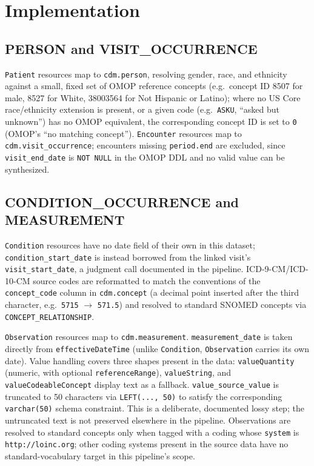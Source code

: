 \documentclass[11pt]{article}
\begin{document}
\section{Implementation}

\subsection{PERSON and VISIT\_OCCURRENCE}

\texttt{Patient} resources map to \texttt{cdm.person}, resolving gender,
race, and ethnicity against a small, fixed set of OMOP reference concepts
(e.g.\ concept ID 8507 for male, 8527 for White, 38003564 for Not Hispanic
or Latino); where no US Core race/ethnicity extension is present, or a
given code (e.g.\ \texttt{ASKU}, ``asked but unknown'') has no OMOP
equivalent, the corresponding concept ID is set to \texttt{0} (OMOP's ``no matching
concept''). \texttt{Encounter} resources map to \texttt{cdm.visit\_occurrence};
encounters missing \texttt{period.end} are excluded, since
\texttt{visit\_end\_date} is \texttt{NOT NULL} in the OMOP DDL and no valid
value can be synthesized.

\subsection{CONDITION\_OCCURRENCE and MEASUREMENT}

\texttt{Condition} resources have no date field of their own in this
dataset; \texttt{condition\_start\_date} is instead borrowed from the
linked visit's \texttt{visit\_start\_date}, a judgment call documented in
the pipeline. ICD-9-CM/ICD-10-CM source codes are reformatted to match the
conventions of the \texttt{concept\_code} column in \texttt{cdm.concept} (a
decimal point inserted after the third character, e.g.\ \texttt{5715} $\to$ \texttt{571.5}) and
resolved to standard SNOMED concepts via \texttt{CONCEPT\_RELATIONSHIP}.

\texttt{Observation} resources map to \texttt{cdm.measurement}.
\texttt{measurement\_date} is taken directly from \texttt{effectiveDateTime}
(unlike \texttt{Condition}, \texttt{Observation} carries its own date).
Value handling covers three shapes present in the data:
\texttt{valueQuantity} (numeric, with optional \texttt{referenceRange}),
\texttt{valueString}, and \texttt{valueCodeableConcept} display text as a
fallback. \texttt{value\_source\_value} is truncated to 50 characters via
\texttt{LEFT(...,\ 50)} to satisfy the corresponding \texttt{varchar(50)}
schema constraint. This is a deliberate, documented lossy step; the
untruncated text is not preserved elsewhere in the pipeline. Observations are resolved to standard concepts only when tagged
with a coding whose \texttt{system} is \texttt{http://loinc.org}; other
coding systems present in the source data have no standard-vocabulary
target in this pipeline's scope.
\end{document}
